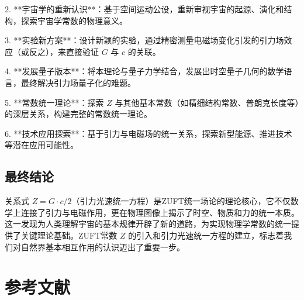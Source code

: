 \documentclass[12pt,a4paper]{article}
\begin{document}
2. **宇宙学的重新认识**：基于空间运动公设，重新审视宇宙的起源、演化和结构，探索宇宙学常数的物理意义。

3. **实验新方案**：设计新颖的实验，通过精密测量电磁场变化引发的引力场效应（或反之），来直接验证 $G$ 与 $c$ 的关联。

4. **发展量子版本**：将本理论与量子力学结合，发展出时空量子几何的数学语言，最终解决引力场量子化的难题。

5. **常数统一理论**：探索 $Z$ 与其他基本常数（如精细结构常数、普朗克长度等）的深层关系，构建完整的常数统一理论。

6. **技术应用探索**：基于引力与电磁场的统一关系，探索新型能源、推进技术等潜在应用可能性。

\subsection{最终结论}
\label{subsection:final_conclusion}

关系式 $Z = G \cdot c / 2$（引力光速统一方程）是ZUFT统一场论的理论核心，它不仅数学上连接了引力与电磁作用，更在物理图像上揭示了时空、物质和力的统一本质。这一发现为人类理解宇宙的基本规律开辟了新的道路，为实现物理学常数的统一提供了关键理论基础。ZUFT常数 $Z$ 的引入和引力光速统一方程的建立，标志着我们对自然界基本相互作用的认识迈出了重要一步。

\newpage
\section{参考文献}
\label{section:references}
\end{document}
